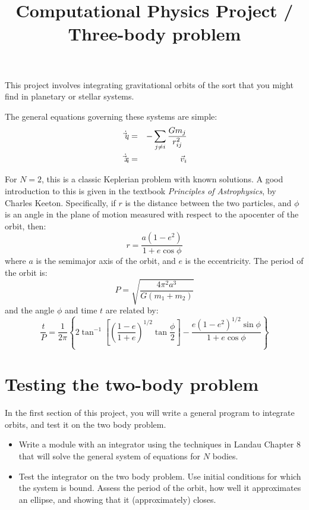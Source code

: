\documentclass[11pt, preprint]{aastex}
\begin{document}
\title{\bf Computational Physics Project / Three-body problem}

This project involves integrating gravitational orbits of the sort
that you might find in planetary or stellar systems. 

The general equations governing these systems are simple:
\begin{eqnarray}
\dot{\vec{v}_i} &=& - \sum_{j \ne i} \frac{Gm_j}{r_{ij}^2} \cr
\dot{\vec{x}_i} &=& \vec{v}_i
\end{eqnarray}

For $N=2$, this is a classic Keplerian problem with known solutions.
A good introduction to this is given in the textbook {\it Principles
  of Astrophysics}, by Charles Keeton. Specifically, if $r$ is the
distance between the two particles, and $\phi$ is an angle in the
plane of motion measured with respect to the apocenter of the orbit,
then:
\begin{equation}
r = \frac{a(1-e^2)}{1+e \cos\phi}
\end{equation}
where $a$ is the semimajor axis of the orbit, and $e$ is the
eccentricity. The period of the orbit is:
\begin{equation}
P = \sqrt{\frac{4\pi^2 a^3}{G(m_1 + m_2)}}
\end{equation}
and the angle $\phi$ and time $t$ are related by:
\begin{equation}
  \frac{t}{P} = \frac{1}{2\pi}\left\{
    2\tan^{-1}\left[\left(\frac{1-e}{1+e}\right)^{1/2}
      \tan\frac{\phi}{2}\right]
    - \frac{e(1-e^2)^{1/2} \sin\phi}{1+e\cos\phi}\right\}
\end{equation}

\section{Testing the two-body problem}

In the first section of this project, you will write a general program
to integrate orbits, and test it on the two body problem.

\begin{itemize}
\item Write a module with an integrator using the techniques in Landau
  Chapter 8 that will solve the general system of equations for $N$
  bodies.
\item Test the integrator on the two body problem. Use initial
  conditions for which the system is bound. Assess the period of the
  orbit, how well it approximates an ellipse, and showing that it
  (approximately) closes.
\end{itemize}
\end{document}
